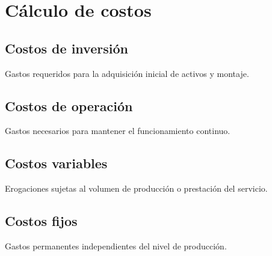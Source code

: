 \section{Cálculo de costos}
\label{sec:calculo_costos}

\subsection{Costos de inversión}
Gastos requeridos para la adquisición inicial de activos y montaje.

\subsection{Costos de operación}
Gastos necesarios para mantener el funcionamiento continuo.

\subsection{Costos variables}
Erogaciones sujetas al volumen de producción o prestación del servicio.

\subsection{Costos fijos}
Gastos permanentes independientes del nivel de producción.


